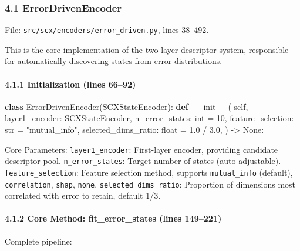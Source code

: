 \documentclass[
  12pt,
]{article}
\newenvironment{Shaded}{}{}
\newcommand{\BuiltInTok}[1]{\textcolor[rgb]{0.00,0.50,0.00}{#1}}
\newcommand{\DecValTok}[1]{\textcolor[rgb]{0.25,0.63,0.44}{#1}}
\newcommand{\FloatTok}[1]{\textcolor[rgb]{0.25,0.63,0.44}{#1}}
\newcommand{\FunctionTok}[1]{\textcolor[rgb]{0.02,0.16,0.49}{#1}}
\newcommand{\KeywordTok}[1]{\textcolor[rgb]{0.00,0.44,0.13}{\textbf{#1}}}
\newcommand{\NormalTok}[1]{#1}
\newcommand{\OperatorTok}[1]{\textcolor[rgb]{0.40,0.40,0.40}{#1}}
\newcommand{\StringTok}[1]{\textcolor[rgb]{0.25,0.44,0.63}{#1}}
\newcommand{\VariableTok}[1]{\textcolor[rgb]{0.10,0.09,0.49}{#1}}
\begin{document}
\subsubsection{4.1 ErrorDrivenEncoder}\label{errordrivenencoder}

File: \texttt{src/scx/encoders/error\_driven.py}, lines 38--492.

This is the core implementation of the two-layer descriptor system, responsible for automatically discovering states from error distributions.

\paragraph{4.1.1 Initialization (lines 66--92)}\label{initialization}

\begin{Shaded}
\begin{Highlighting}[]
\KeywordTok{class}\NormalTok{ ErrorDrivenEncoder(SCXStateEncoder):}
    \KeywordTok{def} \FunctionTok{\_\_init\_\_}\NormalTok{(}
        \VariableTok{self}\NormalTok{,}
\NormalTok{        layer1\_encoder: SCXStateEncoder,}
\NormalTok{        n\_error\_states: }\BuiltInTok{int} \OperatorTok{=} \DecValTok{10}\NormalTok{,}
\NormalTok{        feature\_selection: }\BuiltInTok{str} \OperatorTok{=} \StringTok{"mutual\_info"}\NormalTok{,}
\NormalTok{        selected\_dims\_ratio: }\BuiltInTok{float} \OperatorTok{=} \FloatTok{1.0} \OperatorTok{/} \FloatTok{3.0}\NormalTok{,}
\NormalTok{    ) }\OperatorTok{{-}\textgreater{}} \VariableTok{None}\NormalTok{:}
\end{Highlighting}
\end{Shaded}

Core Parameters: \texttt{layer1\_encoder}: First-layer encoder, providing candidate descriptor pool. \texttt{n\_error\_states}: Target number of states (auto-adjustable). \texttt{feature\_selection}: Feature selection method, supports \texttt{mutual\_info} (default), \texttt{correlation}, \texttt{shap}, \texttt{none}. \texttt{selected\_dims\_ratio}: Proportion of dimensions most correlated with error to retain, default 1/3.

\paragraph{4.1.2 Core Method: fit\_error\_states (lines 149--221)}\label{core-method-fit-error-states}

Complete pipeline:
\end{document}

